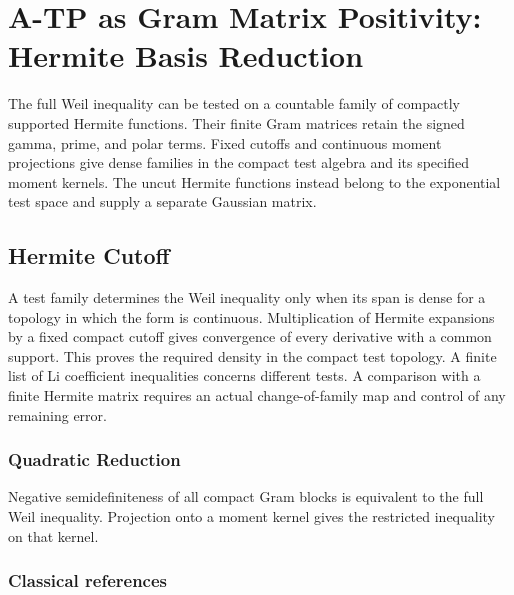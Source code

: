 \chapter{A-TP as Gram Matrix Positivity: Hermite Basis Reduction}
\label{v4-arith:w7-h:chapter}

The full Weil inequality can be tested on a countable family of
compactly supported Hermite functions. Their finite Gram matrices
retain the signed gamma, prime, and polar terms.
Fixed cutoffs and continuous moment projections give dense families
in the compact test algebra and its specified moment kernels.
The uncut Hermite functions instead belong to the exponential test
space and supply a separate Gaussian matrix.

\section{Hermite Cutoff}
\label{v4-arith:w7-h:context}
A test family determines the Weil inequality only when its span is
dense for a topology in which the form is continuous.
Multiplication of Hermite expansions by a fixed compact cutoff gives
convergence of every derivative with a common support.
This proves the required density in the compact test topology.
A finite list of Li coefficient inequalities concerns different tests.
A comparison with a finite Hermite matrix requires an actual
change-of-family map and control of any remaining error.

\subsection{Quadratic Reduction}
\label{v4-arith:w7-h:objective}
Negative semidefiniteness of all compact Gram blocks is equivalent
to the full Weil inequality. Projection onto a moment kernel gives
the restricted inequality on that kernel.

\subsection{Classical references}
\label{v4-arith:w7-h:sources}

